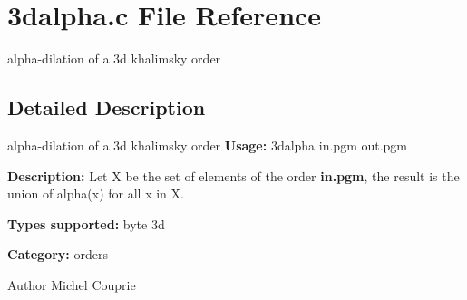 \section{3dalpha.c File Reference}
\label{3dalpha_8c}


alpha-\/dilation of a 3d khalimsky order  




\subsection{Detailed Description}
alpha-\/dilation of a 3d khalimsky order {\bfseries Usage:} 3dalpha in.pgm out.pgm

{\bfseries Description:} Let X be the set of elements of the order {\bfseries in.pgm}, the result is the union of alpha(x) for all x in X.

{\bfseries Types supported:} byte 3d

{\bfseries Category:} orders

\begin{DoxyAuthor}{Author}
Michel Couprie 
\end{DoxyAuthor}
